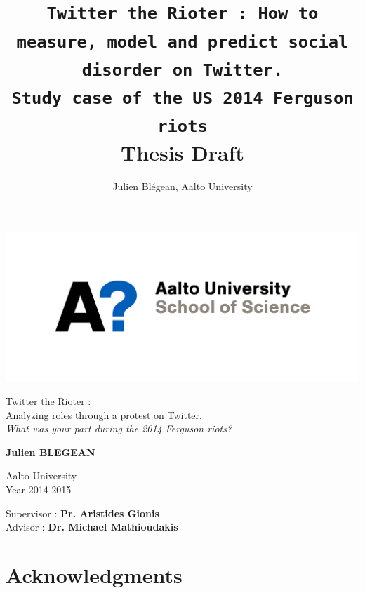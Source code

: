 \documentclass[a4paper,12pt]{report}
\title{\texttt{Twitter the Rioter : How to measure, model and predict social disorder on Twitter. \\Study case of the US 2014 Ferguson riots}\\ \textbf{\Large Thesis Draft}}
\author{Julien Blégean, Aalto University}
\begin{document}
\begin{minipage}[t]{0.4\textwidth}
  \flushleft
  \includegraphics [width=\textwidth]{images/aalto_logo_b.png}
\end{minipage}

\vspace{3.5cm}

\begin{center}
\begin{minipage}[t]{0.85\textwidth}
\begin{center}
    {\LARGE {\textsf{Twitter the Rioter :\\[-5pt] Analyzing roles through a protest on Twitter.\\[5pt] \emph{\large What was your part during the 2014 Ferguson riots?}}}}\\
\end{center}
\end{minipage}
\end{center}

\vspace{1cm}

\begin{center}
    \textbf{\large Julien BLEGEAN}
\end{center}

\begin{center}
    \large Aalto University\\
    Year 2014-2015
\end{center}

\vfill

{\large \noindent Supervisor : \textbf{Pr. Aristides Gionis}\\
Advisor : \textbf{Dr. Michael Mathioudakis}}

\newpage


\chapter*{Acknowledgments}
\end{document}
